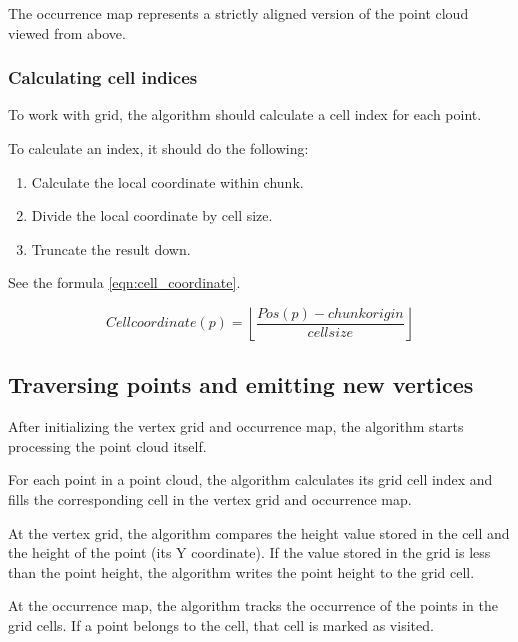 The occurrence map represents a strictly aligned version of the point cloud viewed from above.


\subsubsection{Calculating cell indices}

To work with grid, the algorithm should calculate a cell index for each point.

To calculate an index, it should do the following:
\begin{enumerate}
    \item Calculate the local coordinate within chunk.
    \item Divide the local coordinate by cell size.
    \item Truncate the result down.
\end{enumerate}

See the formula \ref{eqn:cell_coordinate}.

\begin{equation}
\label{eqn:cell_coordinate}
Cell coordinate(p) = \left \lfloor \frac{Pos(p) - chunk origin}{cell size} \right \rfloor
\end{equation}


\subsection{Traversing points and emitting new vertices}

After initializing the vertex grid and occurrence map, the algorithm starts processing the point cloud itself.

For each point in a point cloud, the algorithm  calculates its grid cell index and fills the corresponding cell in the vertex grid and occurrence map.

At the vertex grid, the algorithm compares the height value stored in the cell and the height of the point (its Y coordinate). If the value stored in the grid is less than the point height, the algorithm writes the point height to the grid cell.

At the occurrence map, the algorithm tracks the occurrence of the points in the grid cells. If a point belongs to the cell, that cell is marked as visited.


\begin{algorithm}
\end{algorithm}


